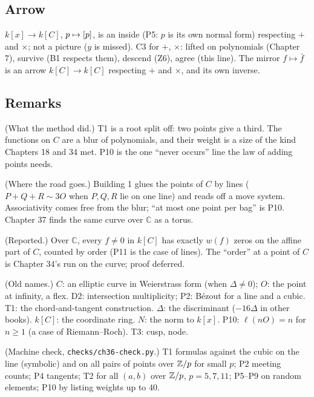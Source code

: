 \subsection*{Arrow}

\begin{lines}
\item[\lab{P12}] $k[x] \to k[C]$, $p \mapsto [p]$, is an inside (P5: $p$ is its own normal form) respecting $+$ and $\times$; not a picture ($y$ is missed). C3 for $+$, $\times$: lifted on polynomials (Chapter 7), survive (B1 respects them), descend (Z6), agree (this line). The mirror $f \mapsto \bar f$ is an arrow $k[C] \to k[C]$ respecting $+$ and $\times$, and its own inverse.
\end{lines}

\subsection*{Remarks}

\begin{lines}
\item[\lab{R1}] (What the method did.) T1 is a root split off: two points give a third. The functions on $C$ are a blur of polynomials, and their weight is a size of the kind Chapters 18 and 34 met. P10 is the one ``never occurs'' line the law of adding points needs.
\item[\lab{R2}] (Where the road goes.) Building 1 glues the points of $C$ by lines ($P + Q + R \sim 3O$ when $P, Q, R$ lie on one line) and reads off a move system. Associativity comes free from the blur; ``at most one point per bag'' is P10. Chapter 37 finds the same curve over $\mathbb{C}$ as a torus.
\item[\lab{R3}] (Reported.) Over $\mathbb{C}$, every $f \ne 0$ in $k[C]$ has exactly $w(f)$ zeros on the affine part of $C$, counted by order (P11 is the case of lines). The ``order'' at a point of $C$ is Chapter 34's run on the curve; proof deferred.
\item[\lab{R4}] (Old names.) $C$: an elliptic curve in Weierstrass form (when $\Delta \ne 0$); $O$: the point at infinity, a flex. D2: intersection multiplicity; P2: B\'ezout for a line and a cubic. T1: the chord-and-tangent construction. $\Delta$: the discriminant ($-16\Delta$ in other books). $k[C]$: the coordinate ring. $N$: the norm to $k[x]$. P10: $\ell(nO) = n$ for $n \ge 1$ (a case of Riemann--Roch). T3: cusp, node.
\item[\lab{R5}] (Machine check, \texttt{checks/ch36-check.py}.) T1 formulas against the cubic on the line (symbolic) and on all pairs of points over $\mathbb{Z}/p$ for small $p$; P2 meeting counts; P4 tangents; T2 for all $(a, b)$ over $\mathbb{Z}/p$, $p = 5, 7, 11$; P5--P9 on random elements; P10 by listing weights up to $40$.
\end{lines}

